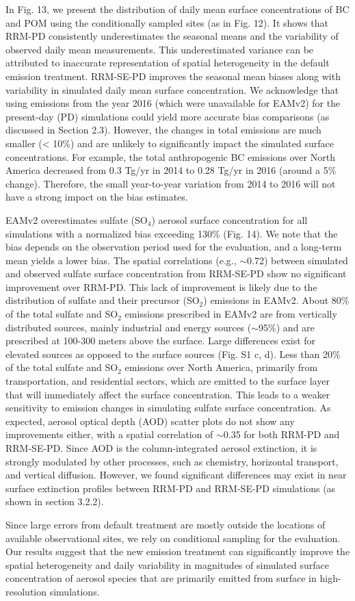 In Fig. 13, we present the distribution of daily mean surface concentrations of BC and POM using the conditionally sampled sites (as in Fig. 12). It shows that RRM-PD consistently underestimates the seasonal means and the variability of observed daily mean measurements. This underestimated variance can be attributed to inaccurate representation of spatial heterogeneity in the default emission treatment. RRM-SE-PD improves the seasonal mean biases along with variability in simulated daily mean surface concentration. We acknowledge that using emissions from the year 2016 (which were unavailable for EAMv2) for the present-day (PD) simulations could yield more accurate bias comparisons (as discussed in Section 2.3). However, the changes in total emissions are much smaller (< 10\%) and are unlikely to significantly impact the simulated surface concentrations. For example, the total anthropogenic BC emissions over North America decreased from 0.3 Tg/yr in 2014 to 0.28 Tg/yr in 2016 (around a 5\% change). Therefore, the small year-to-year variation from 2014 to 2016 will not have a strong impact on the bias estimates.
 

EAMv2 overestimates sulfate (SO$_4$) aerosol surface concentration for all simulations with a normalized bias exceeding 130\% (Fig. 14). We note that the bias depends on the observation period used for the evaluation, and a long-term mean yields a lower bias. The spatial correlations (e.g., $\sim$0.72) between simulated and observed sulfate surface concentration from RRM-SE-PD show no significant improvement over RRM-PD. This lack of improvement is likely due to the distribution of sulfate and their precursor (SO$_2$) emissions in EAMv2. About 80\% of the total sulfate and SO$_2$ emissions prescribed in EAMv2 are from vertically distributed sources, mainly industrial and energy sources ($\sim$95\%) and are prescribed at 100-300 meters above the surface. Large differences exist for elevated sources as opposed to the surface sources (Fig. S1 c, d). Less than 20\% of the total sulfate and SO$_2$ emissions over North America, primarily from transportation, and residential sectors, which are emitted to the surface layer that will immediately affect the surface concentration. This leads to a weaker sensitivity to emission changes in simulating sulfate surface concentration. As expected, aerosol optical depth (AOD) scatter plots do not show any improvements either, with a spatial correlation of $\sim$0.35 for both RRM-PD and RRM-SE-PD. Since AOD is the column-integrated aerosol extinction, it is strongly modulated by other processes, such as chemistry, horizontal transport, and vertical diffusion. However, we found significant differences may exist in near surface extinction profiles between RRM-PD and RRM-SE-PD simulations (as shown in section 3.2.2).

Since large errors from default treatment are mostly outside the locations of available observational sites, we rely on conditional sampling for the evaluation. Our results suggest that the new emission treatment can significantly improve the spatial heterogeneity and daily variability in magnitudes of simulated surface concentration of aerosol species that are primarily emitted from surface in high-resolution simulations.


